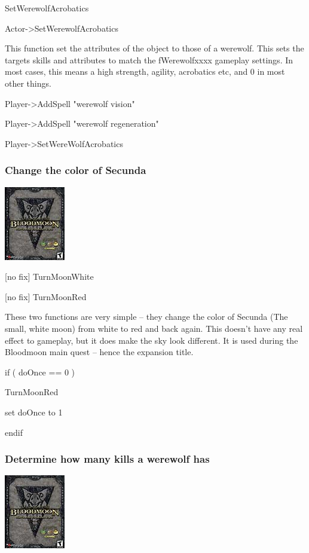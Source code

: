 SetWerewolfAcrobatics

Actor-\textgreater SetWerewolfAcrobatics

This function set the attributes of the object to those of a werewolf.
This sets the targets skills and attributes to match the fWerewolfxxxx
gameplay settings. In most cases, this means a high strength, agility,
acrobatics etc, and 0 in most other things.

Player-\textgreater AddSpell "werewolf vision"

Player-\textgreater AddSpell "werewolf regeneration"

Player-\textgreater SetWereWolfAcrobatics

\hypertarget{change-the-color-of-secunda}{%
\subsubsection{Change the color of
Secunda}\label{change-the-color-of-secunda}}

\includegraphics{media/image7.png}

{[}no fix{]} TurnMoonWhite

{[}no fix{]} TurnMoonRed

These two functions are very simple -- they change the color of Secunda
(The small, white moon) from white to red and back again. This doesn't
have any real effect to gameplay, but it does make the sky look
different. It is used during the Bloodmoon main quest -- hence the
expansion title.

if ( doOnce == 0 )

TurnMoonRed

set doOnce to 1

endif

\hypertarget{determine-how-many-kills-a-werewolf-has}{%
\subsubsection{Determine how many kills a werewolf
has}\label{determine-how-many-kills-a-werewolf-has}}

\includegraphics{media/image7.png}

